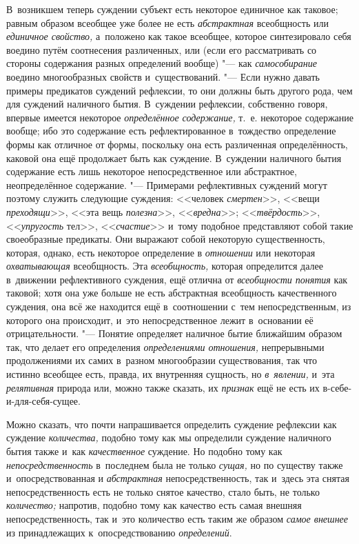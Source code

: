 В~возникшем теперь суждении субъект есть некоторое единичное как таковое;
равным образом всеобщее уже более не есть {\em абстрактная} всеобщность или
{\em единичное свойство,} а~положено как такое всеобщее, которое синтезировало
себя воедино путём соотнесения различенных, или (если его рассматривать со
стороны содержания разных определений вообще) "--- как {\em самособирание}
воедино многообразных свойств и~существований. "--- Если нужно давать примеры
предикатов суждений рефлексии, то они должны быть другого рода, чем для
суждений наличного бытия. В~суждении рефлексии, собственно говоря, впервые
имеется некоторое {\em определённое содержание,}
т.~е. некоторое содержание вообще; ибо это содержание есть
рефлектированное в~тождество определение формы как отличное от формы,
поскольку она есть различенная определённость, каковой она ещё продолжает
быть как суждение. В~суждении наличного бытия содержание есть лишь
некоторое непосредственное или абстрактное, неопределённое содержание. "---
Примерами рефлективных суждений могут поэтому служить следующие суждения:
<<человек {\em смертен}>>, <<вещи {\em преходящи}>>, <<эта вещь
{\em полезна}>>, <<{\em вредна}>>; <<{\em твёрдость}>>, <<{\em упругость}
тел>>, <<{\em счастие}>> и~тому подобное представляют собой такие своеобразные
предикаты. Они выражают собой некоторую существенность, которая, однако, есть
некоторое определение в {\em отношении} или некоторая {\em охватывающая}
всеобщность. Эта {\em всеобщность,} которая определится далее в~движении
рефлективного суждения, ещё отлична от {\em всеобщности понятия} как таковой;
хотя она уже больше не есть абстрактная всеобщность качественного суждения, она
всё же находится ещё в~соотношении с~тем непосредственным, из которого она
происходит, и~это непосредственное лежит в~основании её отрицательности. "---
Понятие определяет наличное бытие ближайшим образом так, что делает его
определения {\em определениями отношения,} непрерывными продолжениями их самих
в~разном многообразии существования, так что истинно всеобщее есть, правда, их
внутренняя сущность, но {\em в~явлении,} и~эта {\em релятивная} природа или,
можно также сказать, их {\em признак} ещё не есть их в-себе-и-для-себя-сущее.

Можно сказать, что почти напрашивается определить суждение рефлексии как
суждение {\em количества,} подобно тому как мы определили суждение наличного
бытия также и~как {\em качественное} суждение. Но подобно тому как
{\em непосредственность} в~последнем была не только {\em сущая,} но по существу
также и~опосредствованная и {\em абстрактная} непосредственность, так и~здесь
эта снятая непосредственность есть не только снятое качество, стало быть, не
только {\em количество;} напротив, подобно тому как качество есть самая внешняя
непосредственность, так и~это количество есть таким же образом
{\em самое внешнее} из принадлежащих к~опосредствованию {\em определений}.

